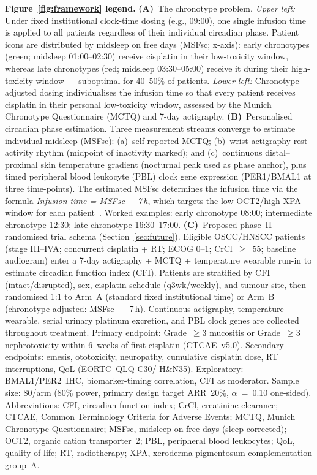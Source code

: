 \documentclass[preprint,review,12pt]{elsarticle}
\begin{document}
{\footnotesize
\noindent\textbf{Figure~\ref{fig:framework} legend.}
    \textbf{(A)}~The chronotype problem. \emph{Upper left:} Under fixed
    institutional clock-time dosing (e.g., 09:00), one single infusion
    time is applied to all patients regardless of their individual
    circadian phase. Patient icons are distributed by midsleep on free
    days (MSFsc; x-axis): early chronotypes (green; midsleep 01:00--02:30)
    receive cisplatin in their low-toxicity window, whereas late
    chronotypes (red; midsleep 03:30--05:00) receive it during their
    high-toxicity window --- suboptimal for 40--50\% of patients.
    \emph{Lower left:} Chronotype-adjusted dosing individualises the
    infusion time so that every patient receives cisplatin in their
    personal low-toxicity window, assessed by the Munich Chronotype
    Questionnaire (MCTQ) and 7-day actigraphy.
    \textbf{(B)}~Personalised circadian phase estimation. Three
    measurement streams converge to estimate individual midsleep (MSFsc):
    (a)~self-reported MCTQ; (b)~wrist actigraphy rest--activity rhythm
    (midpoint of inactivity marked); and (c)~continuous distal--proximal
    skin temperature gradient (nocturnal peak used as phase anchor), plus
    timed peripheral blood leukocyte (PBL) clock gene expression
    (PER1/BMAL1 at three time-points). The estimated MSFsc determines the
    infusion time via the formula \emph{Infusion time = MSFsc $-$ 7\,h},
    which targets the low-OCT2/high-XPA window for each
    patient~\cite{Oda2014, Kang2010}. Worked examples: early chronotype
    08:00; intermediate chronotype 12:30; late chronotype 16:30--17:00.
    \textbf{(C)}~Proposed phase~II randomised trial schema
    (Section~\ref{sec:future}). Eligible OSCC/HNSCC patients (stage
    III--IVA; concurrent cisplatin + RT; ECOG 0--1; CrCl~$\geq$~55;
    baseline audiogram) enter a 7-day actigraphy + MCTQ + temperature
    wearable run-in to estimate circadian function index (CFI). Patients
    are stratified by CFI (intact/disrupted), sex, cisplatin schedule
    (q3wk/weekly), and tumour site, then randomised 1:1 to Arm~A
    (standard fixed institutional time) or Arm~B (chronotype-adjusted:
    MSFsc~$-$~7\,h). Continuous actigraphy, temperature wearable, serial
    urinary platinum excretion, and PBL clock genes are collected
    throughout treatment. Primary endpoint: Grade~$\geq$3 mucositis or
    Grade~$\geq$3 nephrotoxicity within 6~weeks of first cisplatin
    (CTCAE~v5.0). Secondary endpoints: emesis, ototoxicity, neuropathy,
    cumulative cisplatin dose, RT interruptions, QoL (EORTC~QLQ-C30/
    H\&N35). Exploratory: BMAL1/PER2~IHC, biomarker-timing correlation,
    CFI as moderator. Sample size: 80/arm (80\% power, primary design
    target ARR~20\%, $\alpha$~=~0.10 one-sided).
    Abbreviations: CFI, circadian function index; CrCl, creatinine
    clearance; CTCAE, Common Terminology Criteria for Adverse Events;
    MCTQ, Munich Chronotype Questionnaire; MSFsc, midsleep on free days
    (sleep-corrected); OCT2, organic cation transporter~2; PBL, peripheral
    blood leukocytes; QoL, quality of life; RT, radiotherapy; XPA,
    xeroderma pigmentosum complementation group~A.\par}

\clearpage



\end{document}
